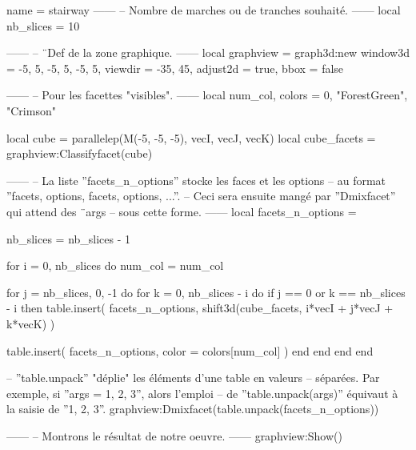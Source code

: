 \documentclass[border = 3pt]{standalone}
\begin{document}
\begin{luadraw}{name = stairway}
------
-- Nombre de marches ou de tranches souhaité.
------
local nb_slices = 10

------
-- ¨Def de la zone graphique.
------
local graphview = graph3d:new{
  window3d = {-5, 5, -5, 5, -5, 5},
  viewdir  = {-35, 45},
  adjust2d = true,
  bbox     = false
}

------
-- Pour les facettes "visibles".
------
local num_col, colors = 0, {"ForestGreen", "Crimson"}

local cube        = parallelep(M(-5, -5, -5), vecI, vecJ, vecK)
local cube_facets = graphview:Classifyfacet(cube)

------
-- La liste ''facets_n_options'' stocke les faces et les options
-- au format ''{facets, options, facets, options, ...}''.
-- Ceci sera ensuite mangé par ''Dmixfacet'' qui attend des ¨args
-- sous cette forme.
------
local facets_n_options = {}

nb_slices = nb_slices - 1

for i = 0, nb_slices do
  num_col = num_col%

  for j = nb_slices, 0, -1 do
    for k = 0, nb_slices - i do
      if j == 0 or k == nb_slices - i then
        table.insert(
          facets_n_options,
          shift3d(cube_facets, i*vecI + j*vecJ + k*vecK)
        )

        table.insert(
          facets_n_options,
          {
            color = colors[num_col]
          }
        )
      end
    end
  end
end

-- ''table.unpack'' "déplie" les éléments d'une table en valeurs
-- séparées. Par exemple, si ''args = {1, 2, 3}'', alors l'emploi
-- de ''table.unpack(args)'' équivaut à la saisie de ''1, 2, 3''.
graphview:Dmixfacet(table.unpack(facets_n_options))

------
-- Montrons le résultat de notre oeuvre.
------
graphview:Show()
\end{luadraw}
\end{document}
